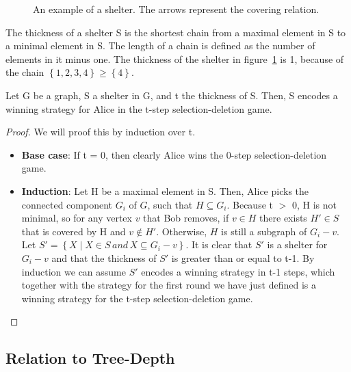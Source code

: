 \begin{figure}[H]

\caption{An example of a shelter. The arrows represent the covering relation. \label{fig:shelter-example}}
\end{figure}
The thickness of a shelter S is the shortest chain from a maximal element in S to a minimal element in S. The length of a chain is defined as the number of elements in it minus one. The thickness of the shelter in figure~\ref{fig:shelter-example} is 1, because of the chain $\left\{ 1, 2, 3, 4\right\} \geq \left\{4\right\}$.
\begin{lemma}
Let G be a graph, S a shelter in G, and t the thickness of S. Then, S encodes a winning strategy for Alice in the t-step selection-deletion game.
\label{lemma:Alice-win}
\end{lemma}
\begin{proof}
We will proof this by induction over t.
\begin{itemize}
  \item \textbf{Base case}: If t = 0, then clearly Alice wins the 0-step selection-deletion game.
  \item \textbf{Induction}: Let H be a maximal element in S. Then, Alice picks the connected component $G_i$ of $G$, such that $H \subseteq G_i$. Because t $>$ 0, H is not minimal, so for any vertex $v$ that Bob removes, if $v \in H$ there exists $H' \in S$ that is covered by H and $v \notin H'$. Otherwise, $H$ is still a subgraph of $G_i - v$. Let $S' =\left\{X \mid X \in S \, and \, X \subseteq G_i - v\right\}$. It is clear that $S'$ is a shelter for $G_i - v$ and that the thickness of $S'$ is greater than or equal to t-1. By induction we can assume $S'$ encodes a winning strategy in t-1 steps, which together with the strategy for the first round we have just defined is a winning strategy for the t-step selection-deletion game.
\end{itemize}
\end{proof}


\subsection{Relation to Tree-Depth}

